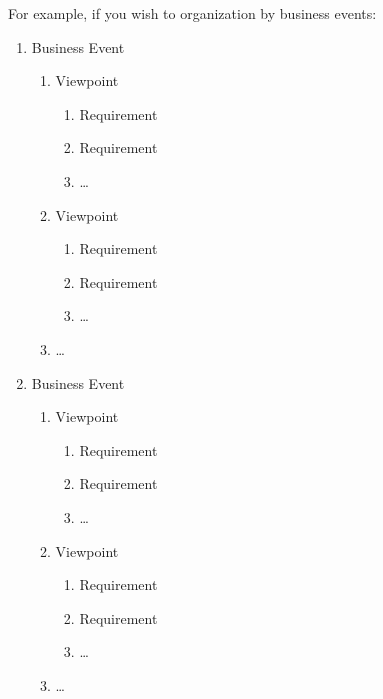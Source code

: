 \documentclass[titlepage]{article}
\begin{document}
For example, if you wish to organization by business events:
\begin{enumerate}[{BE}1.]
	\item Business Event
	\begin{enumerate}[{VP1}.1]
		\item Viewpoint
			\begin{enumerate}
				\item Requirement
				\item Requirement
				\item \dots
			\end{enumerate}
		\item Viewpoint
			\begin{enumerate}
				\item Requirement
				\item Requirement
				\item \dots
			\end{enumerate}
		\item \dots
	\end{enumerate}
	\item Business Event
	\begin{enumerate}[{VP2}.1]
		\item Viewpoint
			\begin{enumerate}
				\item Requirement
				\item Requirement
				\item \dots
			\end{enumerate}
		\item Viewpoint
			\begin{enumerate}
				\item Requirement
				\item Requirement
				\item \dots
			\end{enumerate}
		\item \dots
	\end{enumerate}
\end{enumerate}
\end{document}
